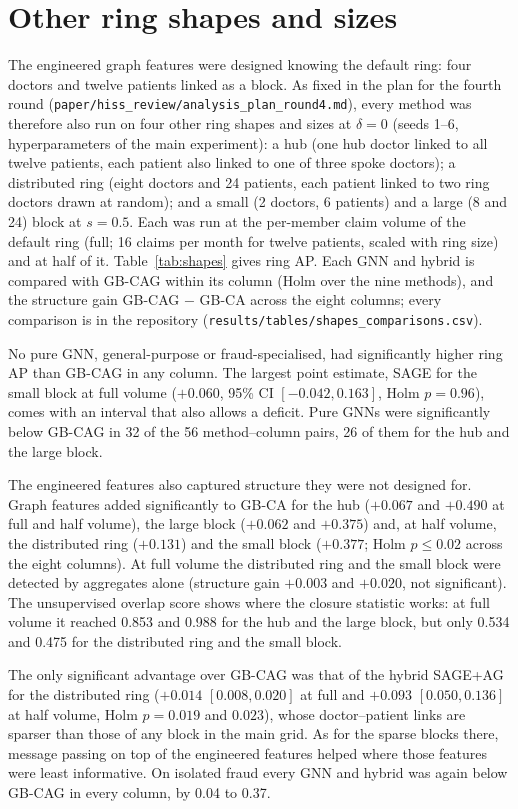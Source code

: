 \documentclass[pdflatex,sn-vancouver-num]{sn-jnl}
\begin{document}
\section{Other ring shapes and sizes}\label{sec:s_shapes}
The engineered graph features were designed knowing the default ring: four doctors and twelve patients linked as a
block. As fixed in the plan for the fourth round (\texttt{paper/\allowbreak hiss\_review/\allowbreak analysis\_plan\_round4.md}), every
method was therefore also run on four other ring shapes and sizes at $\delta=0$ (seeds 1--6, hyperparameters of the
main experiment): a hub (one hub doctor linked to all twelve patients, each patient also linked to one of three spoke
doctors); a distributed ring (eight doctors and 24 patients, each patient linked to two ring doctors drawn at
random); and a small (2 doctors, 6 patients) and a large (8 and 24) block at $s=0.5$. Each was run at the
per-member claim volume of the default ring (full; 16 claims per month for twelve patients, scaled with ring size)
and at half of it. Table~\ref{tab:shapes} gives ring AP. Each GNN and hybrid is compared with GB-CAG within its
column (Holm over the nine methods), and the structure gain GB-CAG $-$ GB-CA across the eight columns; every
comparison is in the repository (\texttt{results/tables/shapes\_comparisons.csv}).

No pure GNN, general-purpose or fraud-specialised, had significantly higher ring AP than GB-CAG in any column. The
largest point estimate, SAGE for the small block at full volume ($+0.060$, 95\% CI $[-0.042, 0.163]$, Holm
$p=0.96$), comes with an interval that also allows a deficit. Pure GNNs were significantly below GB-CAG in 32 of the
56 method--column pairs, 26 of them for the hub and the large block.

The engineered features also captured structure they were not designed for. Graph features added significantly to
GB-CA for the hub ($+0.067$ and $+0.490$ at full and half volume), the large block ($+0.062$ and $+0.375$) and, at
half volume, the distributed ring ($+0.131$) and the small block ($+0.377$; Holm $p\le0.02$ across the eight
columns). At full volume the distributed ring and the small block were detected by aggregates alone (structure gain
$+0.003$ and $+0.020$, not significant). The unsupervised overlap score shows where the closure statistic works: at
full volume it reached 0.853 and 0.988 for the hub and the large block, but only 0.534 and 0.475 for the distributed
ring and the small block.

The only significant advantage over GB-CAG was that of the hybrid SAGE+AG for the distributed ring ($+0.014$
$[0.008, 0.020]$ at full and $+0.093$ $[0.050, 0.136]$ at half volume, Holm $p=0.019$ and $0.023$), whose
doctor--patient links are sparser than those of any block in the main grid. As for the sparse blocks there, message
passing on top of the engineered features helped where those features were least informative. On isolated fraud
every GNN and hybrid was again below GB-CAG in every column, by 0.04 to 0.37.
\end{document}
